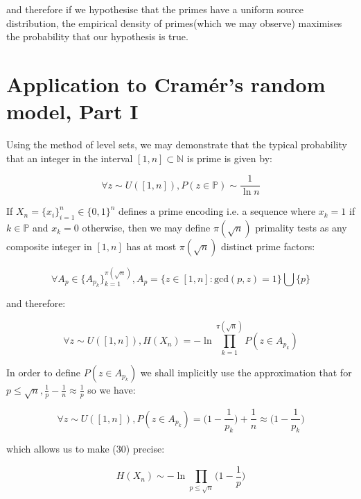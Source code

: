 \documentclass{article}
\begin{document}
and therefore if we hypothesise that the primes have a uniform source distribution, the empirical density of primes(which we may observe) maximises the probability that our hypothesis is true. 

\newpage 

\section{Application to Cramér's random model, Part I}

Using the method of level sets, we may demonstrate that the typical probability that an
integer in the interval $[1,n] \subset \mathbb{N}$ is prime is given by:

\begin{equation}
\forall z \sim U([1,n]), P(z \in \mathbb{P}) \sim \frac{1}{\ln n}
\end{equation}

If $X_n = \{x_i\}_{i=1}^n \in \{0,1\}^n$ defines a prime encoding i.e. a sequence where $x_k = 1$ if $k \in \mathbb{P}$
and $x_k = 0$ otherwise, then we may define $\pi(\sqrt{n})$ primality tests as any composite integer in $[1,n]$
has at most $\pi(\sqrt{n})$ distinct prime factors:

\begin{equation}
\forall A_p \in \{A_{p_k}\}_{k=1}^{\pi(\sqrt{n})}, A_p = \{z \in [1,n]: \text{gcd}(p,z) = 1\} \bigcup \{p\}
\end{equation}

and therefore: 

\begin{equation}
\forall z \sim U([1,n]), H(X_n) = -\ln \prod_{k=1}^{\pi(\sqrt{n})} P(z \in A_{p_k})
\end{equation}

In order to define $P(z \in A_{p_k})$ we shall implicitly use the approximation that for $p \leq \sqrt{n}, \frac{1}{p}-\frac{1}{n} \approx \frac{1}{p}$ so we have:

\begin{equation}
\forall z \sim U([1,n]), P(z \in A_{p_k}) = \big(1-\frac{1}{p_k}\big) + \frac{1}{n} \approx \big(1-\frac{1}{p_k}\big)
\end{equation}

which allows us to make (30) precise:

\begin{equation}
H(X_n) \sim -\ln \prod_{p \leq \sqrt{n}} \big(1-\frac{1}{p}\big)
\end{equation}
\end{document}

